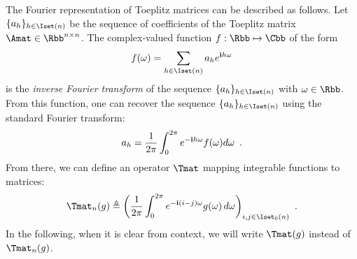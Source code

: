 %
%
%
%


The Fourier representation of Toeplitz matrices can be described as follows.
Let $\{a_h\}_{h \in \Iset(n)}$ be the sequence of coefficients of the Toeplitz matrix $\Amat \in \Rbb^{n\times n}$.
The complex-valued function $f: \Rbb \mapsto \Cbb$ of the form
\begin{equation}
  f(\omega) = \sum_{h \in \Iset(n)} a_h e^{\ci h \omega}
\end{equation}
is the \emph{inverse Fourier transform} of the sequence $\{a_h\}_{h \in \Iset(n)}$ with $\omega \in \Rbb$.
From this function, one can recover the sequence $\{a_h\}_{h \in \Iset(n)}$ using the standard Fourier transform:
\begin{equation}
  a_h = \frac{1}{2\pi} \int_0^{2\pi} e^{-\mathbf{i} h \omega} f(\omega) d\omega \enspace.
\end{equation}
\noindent
From there, we can define an operator $\Tmat$ mapping integrable functions to matrices:
\begin{equation} \label{equation:ch2-toeplitz_operator}
  \Tmat_n(g) \triangleq \leftmat\frac{1}{2\pi}\int_{0}^{2\pi}e^{-\ci(i-j)\omega}g(\omega)\,d\omega\rightmat_{i,j \in \Iset_0(n)} \enspace.
\end{equation}
In the following, when it is clear from context, we will write $\Tmat(g)$ instead of $\Tmat_n(g)$.





